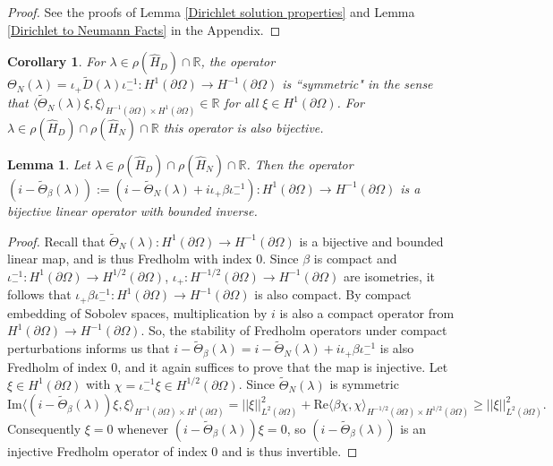\documentclass{article}
\numberwithin{equation}{section}
\newtheorem{lemma}{Lemma}[section]
\newtheorem{corollary}{Corollary}[section]
\begin{document}
\begin{proof}
    See the proofs of Lemma \ref{Dirichlet solution properties} and Lemma \ref{Dirichlet to Neumann Facts} in the Appendix.
\end{proof}
\begin{corollary}
    For $\lambda \in \rho(\hat{H}_D)\cap \mathbb{R}$, the operator $\Theta_N(\lambda)=\iota_+\tilde{D}(\lambda)\iota_-^{-1}:H^{1}(\partial \Omega)\to H^{-1}(\partial \Omega)$ is ``symmetric" in the sense that $\langle \tilde{\Theta}_N(\lambda)\xi, \xi \rangle_{H^{-1}(\partial \Omega)\times H^1(\partial \Omega)} \in \mathbb{R}$ for all $\xi \in H^1(\partial \Omega)$. For $\lambda \in \rho(\hat{H}_D)\cap \rho(\hat{H}_N)\cap \mathbb{R}$ this operator is also bijective.
\end{corollary}
    \begin{lemma}
        Let $\lambda \in \rho(\hat{H}_D)\cap \rho(\hat{H}_N)\cap \mathbb{R}$. Then the operator $(i-\tilde\Theta_\beta(\lambda)):=(i-\tilde{\Theta}_N(\lambda)+ i\iota_+ \beta \iota_-^{-1}):H^1(\partial \Omega)\to H^{-1}(\partial \Omega)$ is a bijective linear operator with bounded inverse.
    \end{lemma}
    \begin{proof}
        Recall that $\tilde{\Theta}_N(\lambda):H^1(\partial \Omega)\to H^{-1}(\partial \Omega)$ is a bijective and bounded linear map, and is thus Fredholm with index $0$. Since $\beta$ is compact and $\iota_-^{-1}:H^{1}(\partial \Omega) \to H^{1/2}(\partial \Omega)$, $\iota_+:H^{-1/2}(\partial \Omega)\to H^{-1}(\partial \Omega)$ are isometries, it follows that $\iota_+ \beta \iota_-^{-1}:H^{1}(\partial \Omega)\to H^{-1}(\partial \Omega)$ is also compact. By compact embedding of Sobolev spaces, multiplication by $i$ is also a compact operator from $H^{1}(\partial \Omega)\to H^{-1}(\partial \Omega)$. So, the stability of Fredholm operators under compact perturbations \cite{Brezis} informs us that $i-\tilde{\Theta}_\beta(\lambda)=i-\tilde{\Theta}_N(\lambda)+ i\iota_+ \beta \iota_-^{-1}$ is also Fredholm of index $0$, and it again suffices to prove that the map is injective. Let $\xi \in H^1(\partial \Omega)$ with $\chi=\iota_-^{-1}\xi \in H^{1/2}(\partial \Omega)$. Since $\tilde{\Theta}_N(\lambda)$ is symmetric
        \begin{equation}\label{injectivity inequality}
            \text{Im} \langle (i - \tilde{\Theta}_\beta(
            \lambda
            ))\xi, \xi \rangle_{H^{-1}(\partial \Omega)\times H^{1}(\partial \Omega)}= ||\xi||^2_{L^2(\partial \Omega)} + \text{Re} \langle \beta \chi,\chi \rangle_{H^{-1/2}(\partial \Omega)\times H^{1/2}(\partial \Omega)}\geq ||\xi||_{L^2(\partial \Omega)}^2.
        \end{equation}
        Consequently $\xi=0$ whenever $(i-\tilde{\Theta}_\beta(\lambda))\xi=0$, so $(i-\tilde\Theta_\beta(
        \lambda
        ))$ is an injective Fredholm operator of index $0$ and is thus invertible.
    \end{proof}
\end{document}
